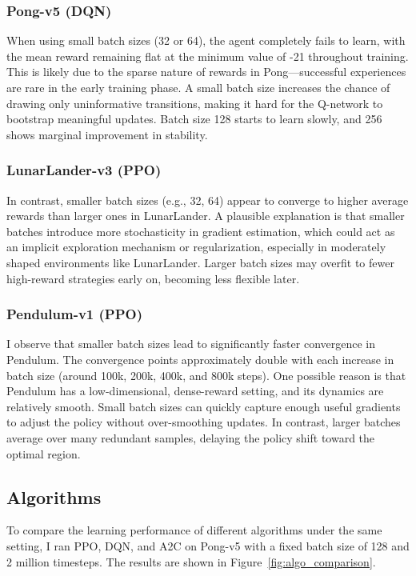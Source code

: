 \documentclass[10pt,twocolumn,letterpaper]{article}
\begin{document}
\subsubsection{Pong-v5 (DQN)}
When using small batch sizes (32 or 64), the agent completely fails to learn, with the mean reward remaining flat at the minimum value of -21 throughout training. This is likely due to the sparse nature of rewards in Pong—successful experiences are rare in the early training phase. A small batch size increases the chance of drawing only uninformative transitions, making it hard for the Q-network to bootstrap meaningful updates. Batch size 128 starts to learn slowly, and 256 shows marginal improvement in stability.

\subsubsection{LunarLander-v3 (PPO)}
In contrast, smaller batch sizes (e.g., 32, 64) appear to converge to higher average rewards than larger ones in LunarLander. A plausible explanation is that smaller batches introduce more stochasticity in gradient estimation, which could act as an implicit exploration mechanism or regularization, especially in moderately shaped environments like LunarLander. Larger batch sizes may overfit to fewer high-reward strategies early on, becoming less flexible later.

\subsubsection{Pendulum-v1 (PPO)}  
I observe that smaller batch sizes lead to significantly faster convergence in Pendulum. The convergence points approximately double with each increase in batch size (around 100k, 200k, 400k, and 800k steps). One possible reason is that Pendulum has a low-dimensional, dense-reward setting, and its dynamics are relatively smooth. Small batch sizes can quickly capture enough useful gradients to adjust the policy without over-smoothing updates. In contrast, larger batches average over many redundant samples, delaying the policy shift toward the optimal region.

\subsection{Algorithms}
To compare the learning performance of different algorithms under the same setting, I ran PPO, DQN, and A2C on Pong-v5 with a fixed batch size of 128 and 2 million timesteps. The results are shown in Figure~\ref{fig:algo_comparison}.
\end{document}
